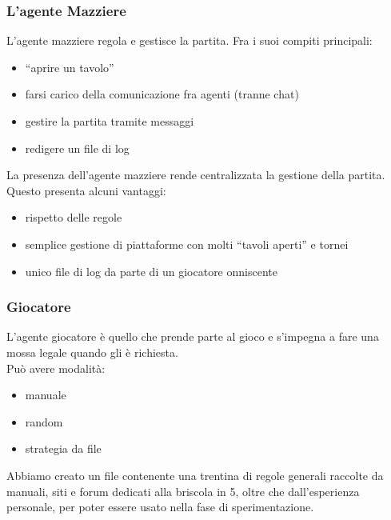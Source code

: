 \documentclass{beamer}
\newcommand*\lista{\item[$\diamondsuit$]}
\begin{document}



\begin{frame}
   \frametitle{L'agente Mazziere}
   L'agente mazziere regola e gestisce la partita. Fra i suoi compiti principali:
   \begin{itemize}
      \pause
      \lista ``aprire un tavolo'' 
      \pause
      \lista farsi carico della comunicazione fra agenti (tranne chat)
      \pause
      \lista gestire la partita tramite messaggi
      \pause
      \lista redigere un file di log
   \end{itemize}
   \vfill
   \pause
   La presenza dell'agente mazziere rende centralizzata la gestione della partita. 
   Questo presenta alcuni vantaggi:
   \begin{itemize}
      \pause
      \lista rispetto delle regole
      \pause
      \lista semplice gestione di piattaforme con molti ``tavoli aperti'' e tornei
      \pause
      \lista unico file di log da parte di un giocatore onniscente
   \end{itemize}
\end{frame}


\begin{frame}
   \frametitle{Giocatore}
   L'agente giocatore è quello che prende parte al gioco e s'impegna a fare una mossa legale quando gli è richiesta.\\
   \vfill
   \pause   
   Può avere modalità:
   \begin{itemize}
      \lista manuale
      \lista random
      \lista strategia da file
   \end{itemize}
   \vfill
   \pause
   Abbiamo creato un file contenente una trentina di regole generali raccolte da manuali, siti e forum dedicati alla briscola in 5, oltre che dall'esperienza personale, per poter essere usato nella fase di sperimentazione.
\end{frame}

\end{document}
